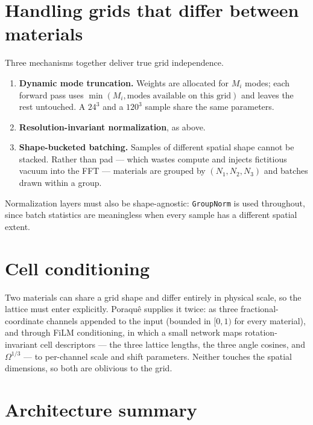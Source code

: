 \section{Handling grids that differ between materials}

Three mechanisms together deliver true grid independence.

\begin{enumerate}
  \item \textbf{Dynamic mode truncation.} Weights are allocated for $M_i$
    modes; each forward pass uses
    $\min(M_i, \text{modes available on this grid})$ and leaves the rest
    untouched. A $24^3$ and a $120^3$ sample share the same parameters.
  \item \textbf{Resolution-invariant normalization}, as above.
  \item \textbf{Shape-bucketed batching.} Samples of different spatial shape
    cannot be stacked. Rather than pad --- which wastes compute and injects
    fictitious vacuum into the FFT --- materials are grouped by
    $(N_1,N_2,N_3)$ and batches drawn within a group.
\end{enumerate}

Normalization layers must also be shape-agnostic: \texttt{GroupNorm} is used
throughout, since batch statistics are meaningless when every sample has a
different spatial extent.

\section{Cell conditioning}

Two materials can share a grid shape and differ entirely in physical scale, so
the lattice must enter explicitly. Poraqu\^e supplies it twice: as three
fractional-coordinate channels appended to the input (bounded in $[0,1)$ for
every material), and through FiLM conditioning, in which a small network maps
rotation-invariant cell descriptors --- the three lattice lengths, the three
angle cosines, and $\Omega^{1/3}$ --- to per-channel scale and shift
parameters. Neither touches the spatial dimensions, so both are oblivious to
the grid.

\section{Architecture summary}

